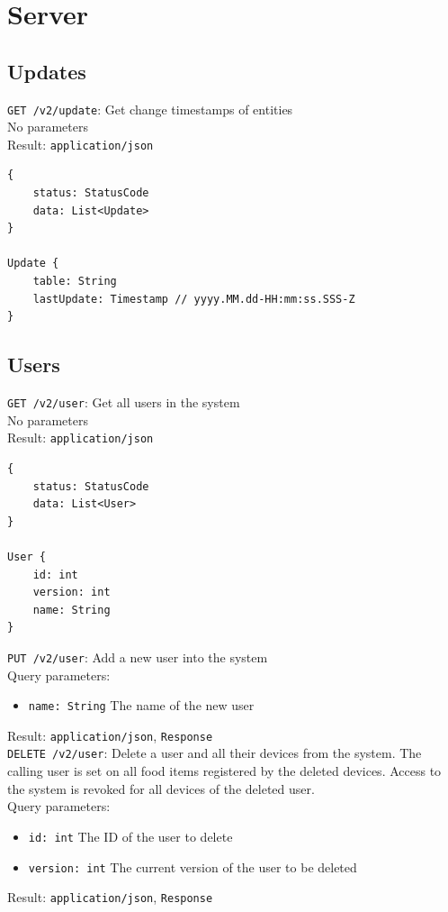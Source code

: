 \documentclass[12pt]{report}
\begin{document}
\section{Server}

\subsection{Updates}

\texttt{GET /v2/update}: Get change timestamps of entities\\
No parameters\\
Result: \texttt{application/json}
\begin{lstlisting}
{
    status: StatusCode
    data: List<Update>
}

Update {
    table: String
    lastUpdate: Timestamp // yyyy.MM.dd-HH:mm:ss.SSS-Z
}
\end{lstlisting}

\subsection{Users}

\texttt{GET /v2/user}: Get all users in the system\\
No parameters\\
Result: \texttt{application/json}
\begin{lstlisting}
{
    status: StatusCode
    data: List<User>
}

User {
    id: int
    version: int
    name: String
}
\end{lstlisting}\vspace{7mm}
\texttt{PUT /v2/user}: Add a new user into the system\\
Query parameters:
\begin{itemize}
\item \texttt{name: String} The name of the new user
\end{itemize}
Result: \texttt{application/json}, \texttt{Response}\vspace{7mm}\\
\texttt{DELETE /v2/user}: Delete a user and all their devices from the system.
The calling user is set on all food items registered by the deleted devices.
Access to the system is revoked for all devices of the deleted user.\\
Query parameters:
\begin{itemize}
\item \texttt{id: int} The ID of the user to delete
\item \texttt{version: int} The current version of the user to be deleted
\end{itemize}
Result: \texttt{application/json}, \texttt{Response}
\end{document}
